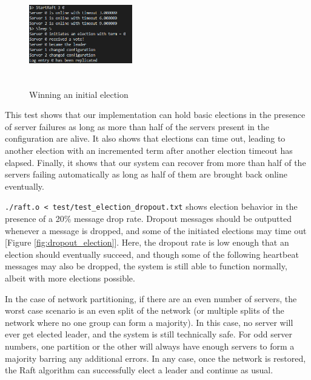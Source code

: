 \documentclass[letterpaper,twocolumn,10pt]{article}
\begin{document}
\begin{figure}[htb!]
\centering
\includegraphics[width=0.4\textwidth,height=45mm]{images/initial_election.png}
\caption{Winning an initial election}
\label{fig:initial_election}
\end{figure}

This test shows that our implementation can hold basic elections in the presence of server failures as long as more than half of the servers present in the configuration are alive. It also shows that elections can time out, leading to another election with an incremented term after another election timeout has elapsed. Finally, it shows that our system can recover from more than half of the servers failing automatically as long as half of them are brought back online eventually.

\texttt{./raft.o < test/test\_election\_dropout.txt} shows election behavior in the presence of a 20\% message drop rate. Dropout messages should be outputted whenever a message is dropped, and some of the initiated elections may time out [Figure \ref{fig:dropout_election}]. Here, the dropout rate is low enough that an election should eventually succeed, and though some of the following heartbeat messages may also be dropped, the system is still able to function normally, albeit with more elections possible.

In the case of network partitioning, if there are an even number of servers, the worst case scenario is an even split of the network (or multiple splits of the network where no one group can form a majority). In this case, no server will ever get elected leader, and the system is still technically safe. For odd server numbers, one partition or the other will always have enough servers to form a majority barring any additional errors. In any case, once the network is restored, the Raft algorithm can successfully elect a leader and continue as usual.
\end{document}
